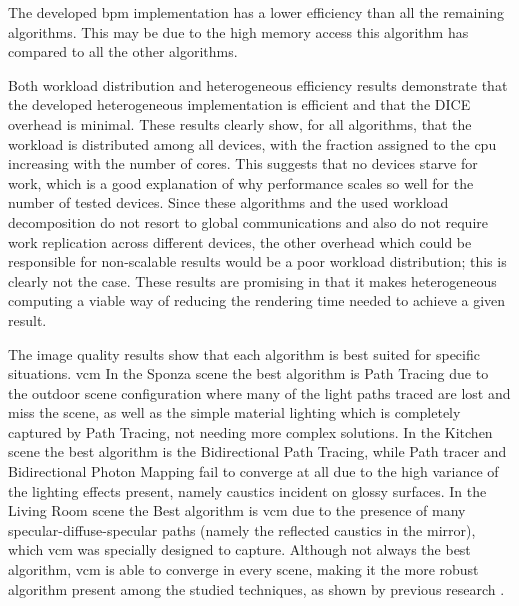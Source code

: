 The developed \gls{bpm} implementation has a lower efficiency than all the remaining algorithms. This may be due to the high memory access this algorithm has compared to all the other algorithms.

Both workload distribution and heterogeneous efficiency results demonstrate that the developed heterogeneous implementation is efficient and that the DICE overhead is minimal. These results clearly show, for all algorithms, that the workload is distributed among all devices, with the fraction assigned to the \gls{cpu} increasing with the number of cores. This suggests that no devices starve for work, which is a good explanation of why performance scales so well for the number of tested devices. Since these algorithms and the used workload decomposition do not resort to global communications and also do not require work replication across different devices, the other overhead which could be responsible for non-scalable results would be a poor workload distribution; this is clearly not the case. These results are promising in that it makes heterogeneous computing a viable way of reducing the rendering time needed to achieve a given result.

The image quality results show that each algorithm is best suited for specific situations. \gls{vcm} In the Sponza scene the best algorithm is Path Tracing due to the outdoor scene configuration where many of the light paths traced are lost and miss the scene, as well as the simple material lighting which is completely captured by Path Tracing, not needing more complex solutions. In the Kitchen scene the best algorithm is the Bidirectional Path Tracing, while Path tracer and Bidirectional Photon Mapping fail to converge at all due to the high variance of the lighting effects present, namely caustics incident on glossy surfaces. In the Living Room scene the Best algorithm is \gls{vcm} due to the presence of many specular-diffuse-specular paths (namely the reflected caustics in the mirror), which \gls{vcm} was specially designed to capture. Although not always the best algorithm, \gls{vcm} is able to converge in every scene, making it the more robust algorithm present among the studied techniques, as shown by previous research \citep{davidovivc2014progressive}.


